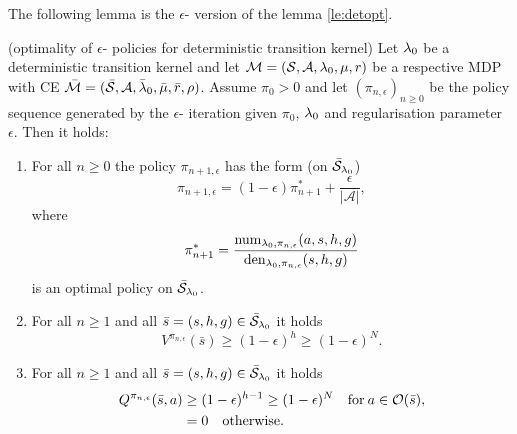 The following lemma is the $\epsilon$-\eUDRL{} version of the lemma \ref{le:detopt}.
\begin{lemma}\label{le:edetopt}(optimality of $\epsilon$-\eUDRL{} policies for deterministic transition kernel)
Let $\mathit{\lambda}_0$ be
a deterministic transition kernel and let $\mathcal{M}=(\mathcal{S},\mathcal{A},\mathit{\lambda}_0,\mu,r)$ be a respective MDP with CE $\bar{\mathcal{M}}=(\bar{\mathcal{S}},\mathcal{A},\bar{\mathit{\lambda}}_0,\bar{\mu},\bar{r},\rho)$. 
Assume $\pi_0 > 0$ and let $(\pi_{n,\epsilon})_{n\geq 0}$ be the policy sequence generated by the $\epsilon$-\eUDRL{} iteration given $\pi_0$, $\mathit{\lambda}_0$ and regularisation parameter $\epsilon$. Then it holds:
\begin{enumerate}
\item For all $n \geq 0$ the policy $\pi_{n+1,\epsilon}$ has the form (on $\bar{\mathcal{S}}_{\mathit{\lambda}_0}$) 
$$
\pi_{n+1,\epsilon} = (1-\epsilon) \pi_{n+1}^* + \frac{\epsilon}{|\mathcal{A}|},
$$
where 
$$
\pi_{n+1}^* = \frac{\mathrm{num}_{\mathit{\lambda}_0,\pi_{n,\epsilon}}(a,s,h,g)}{\mathrm{den}_{\mathit{\lambda}_0,\pi_{n,\epsilon}}(s,h,g)}
$$
is an optimal policy on $\bar{\mathcal{S}}_{\mathit{\lambda}_0}$.
\item For all $n\geq 1$ and all $\bar{s}=(s,h,g)\in \bar{\mathcal{S}}_{\mathit{\lambda}_0}$ it holds
$$
V^{\pi_{n,\epsilon}}(\bar{s}) \geq (1-\epsilon)^h \geq (1-\epsilon)^N.
$$
\item For all $n\geq 1$ and all $\bar{s}=(s,h,g)\in \bar{\mathcal{S}}_{\mathit{\lambda}_0}$ it holds
\begin{align*}
Q^{\pi_{n,\epsilon}}(\bar{s},a) &\geq (1-\epsilon)^{h-1} \geq (1-\epsilon)^N \quad \text{for} \:  a \in \mathcal{O}(\bar{s}),
\\
&= 0 \quad \text{otherwise.} 
\end{align*}
\end{enumerate}
\end{lemma}

